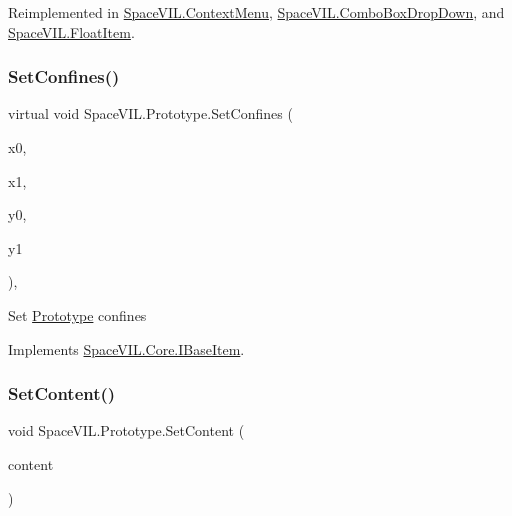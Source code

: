 Reimplemented in \mbox{\hyperlink{class_space_v_i_l_1_1_context_menu_ae8eaad3b3f7858ab1d03f5a18d94e4ca}{Space\+V\+I\+L.\+Context\+Menu}}, \mbox{\hyperlink{class_space_v_i_l_1_1_combo_box_drop_down_a236066889e0b652410d02de2b4cb51c7}{Space\+V\+I\+L.\+Combo\+Box\+Drop\+Down}}, and \mbox{\hyperlink{class_space_v_i_l_1_1_float_item_ada12a95045db04f1a5e196a14f1a8d0f}{Space\+V\+I\+L.\+Float\+Item}}.

\mbox{\label{class_space_v_i_l_1_1_prototype_ac409209f9adab44b149b5dff41bb2b00}} 
\subsubsection{\texorpdfstring{Set\+Confines()}{SetConfines()}\hspace{0.1cm}{\footnotesize\ttfamily [2/2]}}
{\footnotesize\ttfamily virtual void Space\+V\+I\+L.\+Prototype.\+Set\+Confines (\begin{DoxyParamCaption}\item[{int}]{x0,  }\item[{int}]{x1,  }\item[{int}]{y0,  }\item[{int}]{y1 }\end{DoxyParamCaption})\hspace{0.3cm}{\ttfamily [inline]}, {\ttfamily [virtual]}}



Set \mbox{\hyperlink{class_space_v_i_l_1_1_prototype}{Prototype}} confines 



Implements \mbox{\hyperlink{interface_space_v_i_l_1_1_core_1_1_i_base_item}{Space\+V\+I\+L.\+Core.\+I\+Base\+Item}}.

\mbox{\label{class_space_v_i_l_1_1_prototype_aae3089e9f3585ccbf1b5a935cf0c0b27}} 
\subsubsection{\texorpdfstring{Set\+Content()}{SetContent()}}
{\footnotesize\ttfamily void Space\+V\+I\+L.\+Prototype.\+Set\+Content (\begin{DoxyParamCaption}\item[{List$<$ \mbox{\hyperlink{interface_space_v_i_l_1_1_core_1_1_i_base_item}{I\+Base\+Item}} $>$}]{content }\end{DoxyParamCaption})\hspace{0.3cm}{\ttfamily [inline]}}



